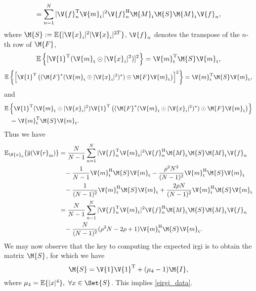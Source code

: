 \documentclass[journal,a4paper,10pt, romanappendices]{IEEEtran}
\begin{document}
\begin{IEEEproof}
\begin{align}
&\hspace{3mm}=\sum_{n=1}^N |\V{f}_n^{\rm T}\V{m}_{\rm t}|^2\V{f}_n^{\rm H}\M{M}_{\rm t}\M{S}\M{M}_{\rm t}\V{f}_n,
\end{align}
where $\M{S}:=\mathbb{E}\{|\V{x}_i|^2|\V{x}_i|^{2T}\}$, $\V{f}_n$ denotes the transpose of the $n$-th row of $\M{F}$,
\begin{equation}
\mathbb{E}\left\{[\V{1}^{\rm T}(\V{m}_{\rm t}\odot|\V{x}_i|^2)]^2\right\}=\V{m}_{\rm t}^{\rm T}\M{S}\V{m}_{\rm t}, \nonumber
\end{equation}
\begin{align}
\mathbb{E}\left\{\left[\V{1}^{\rm T}\left((\M{F}^*(\V{m}_{\rm t}\odot|\V{x}_i|^2)^*)\odot \M{F}\V{m}_{\rm t}\right)\right]^2\right\}=\V{m}_{\rm t}^{\rm T}\M{S}\V{m}_{\rm t}, \nonumber
\end{align}
and
\begin{align}
&\mathbb{E}\left\{\V{1}^{\rm T}(\V{m}_{\rm t}\odot|\V{x}_i|^2)\V{1}^{\rm T}\left((\M{F}^*(\V{m}_{\rm t}\odot|\V{x}_i|^2)^*)\odot \M{F}\V{m}_{\rm t}\right)\right\} \nonumber\\
&\hspace{3mm}=\V{m}_{\rm t}^{\rm T}\M{S}\V{m}_{\rm t}. \nonumber
\end{align}
Thus we have
\begin{align}
\mathbb{E}_{\V{x}_0}\{\overline{g}(\V{r}_{\rm m})\}&=\frac{N}{N-1}\sum_{n=1}^N|\V{f}_n^{\rm T}\V{m}_{\rm t}|^2\V{f}_n^{\rm H}\M{M}_{\rm t}\M{S}\M{M}_{\rm t}\V{f}_n\nonumber\\
&\hspace{3mm}-\frac{1}{N-1}\V{m}_{\rm t}^{\rm H}\M{S}\V{m}_{\rm t}-\frac{\rho^2N^2}{(N-1)^2}\V{m}_{\rm t}^{\rm H}\M{S}\V{m}_{\rm t} \nonumber\\
&\hspace{3mm}-\frac{1}{(N-1)^2}\V{m}_{\rm t}^{\rm H}\M{S}\V{m}_{\rm t}+\frac{2\rho N}{(N-1)^2}\V{m}_{\rm t}^{\rm H}\M{S}\V{m}_{\rm t}\nonumber\\
&=\frac{N}{N-1}\sum_{n=1}^N|\V{f}_n^{\rm T}\V{m}_{\rm t}|^2\V{f}_n^{\rm H}\M{M}_{\rm t}\M{S}\M{M}_{\rm t}\V{f}_n\nonumber \\
&\hspace{3mm}-\frac{N}{(N-1)^2}(\rho^2N-2\rho+1)\V{m}_{\rm t}^{\rm H}\M{S}\V{m}_{\rm t}.
\end{align}
We may now observe that the key to computing the expected \ac{irgi} is to obtain the matrix $\M{S}$, for which we have
\begin{equation}
\M{S}=\V{1}\V{1}^{\rm T} + (\mu_4-1)\M{I},
\end{equation}
where $\mu_4 = \mathbb{E}\{|x|^4\},~\forall x\in\Set{S}$. This implies \eqref{eirgi_data}.
\end{IEEEproof}
\end{document}
